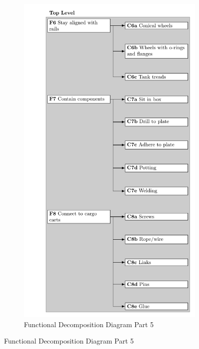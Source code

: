 \documentclass[class=../../report, crop=false]{standalone}
\begin{document}
\begin{figure}[!htb]
	\ContinuedFloat
	\begin{subfigure}{\textwidth}
		\centering
		\includegraphics[trim=10.5cm 0 0 0,scale=0.75]{../../../bin/funcdecomp-5}
		\caption{Functional Decomposition Diagram Part 5}
	\end{subfigure}
\end{figure}
\end{document}
